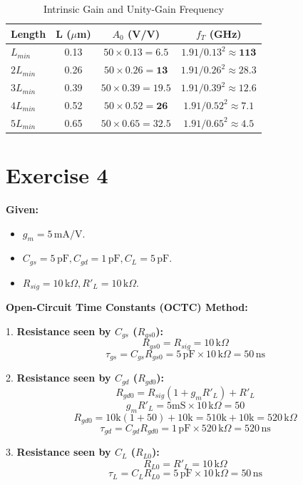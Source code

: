 \documentclass[11pt, a4paper]{article}
\newcommand{\mA}{\,\text{mA}}
\newcommand{\kohm}{\,\text{k}\Omega}
\newcommand{\pF}{\,\text{pF}}
\newcommand{\ns}{\,\text{ns}}
\begin{document}
\begin{table}[H]
\centering
\caption{Intrinsic Gain and Unity-Gain Frequency}
\begin{tabular}{lccc}
\toprule
\textbf{Length} & \textbf{L ($\mu$m)} & \textbf{$A_0$ (V/V)} & \textbf{$f_T$ (GHz)} \\
\midrule
$L_{min}$ & 0.13 & $50 \times 0.13 = \mathbf{6.5}$ & $1.91 / 0.13^2 \approx \mathbf{113}$ \\
$2L_{min}$ & 0.26 & $50 \times 0.26 = \mathbf{13}$ & $1.91 / 0.26^2 \approx \mathbf{28.3}$ \\
$3L_{min}$ & 0.39 & $50 \times 0.39 = \mathbf{19.5}$ & $1.91 / 0.39^2 \approx \mathbf{12.6}$ \\
$4L_{min}$ & 0.52 & $50 \times 0.52 = \mathbf{26}$ & $1.91 / 0.52^2 \approx \mathbf{7.1}$ \\
$5L_{min}$ & 0.65 & $50 \times 0.65 = \mathbf{32.5}$ & $1.91 / 0.65^2 \approx \mathbf{4.5}$ \\
\bottomrule
\end{tabular}
\end{table}

\section*{Exercise 4}

\textbf{Given:}
\begin{itemize}
    \item $g_m = 5 \mA/\text{V}$.
    \item $C_{gs} = 5 \pF, C_{gd} = 1 \pF, C_L = 5 \pF$.
    \item $R_{sig} = 10 \kohm, R'_L = 10 \kohm$.
\end{itemize}

\textbf{Open-Circuit Time Constants (OCTC) Method:}

1. \textbf{Resistance seen by $C_{gs}$ ($R_{gs0}$):}
\[ R_{gs0} = R_{sig} = 10 \kohm \]
\[ \tau_{gs} = C_{gs} R_{gs0} = 5 \pF \times 10 \kohm = 50 \ns \]

2. \textbf{Resistance seen by $C_{gd}$ ($R_{gd0}$):}
\[ R_{gd0} = R_{sig} (1 + g_m R'_L) + R'_L \]
\[ g_m R'_L = 5 \text{mS} \times 10 \kohm = 50 \]
\[ R_{gd0} = 10\text{k} (1 + 50) + 10\text{k} = 510\text{k} + 10\text{k} = 520 \kohm \]
\[ \tau_{gd} = C_{gd} R_{gd0} = 1 \pF \times 520 \kohm = 520 \ns \]

3. \textbf{Resistance seen by $C_{L}$ ($R_{L0}$):}
\[ R_{L0} = R'_L = 10 \kohm \]
\[ \tau_{L} = C_{L} R_{L0} = 5 \pF \times 10 \kohm = 50 \ns \]
\end{document}
